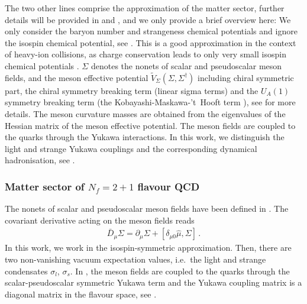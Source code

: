 \documentclass[reprint,twocolumn,superscriptaddress,preprintnumbers,amsmath,amssymb,aps,prd,floatfix]{revtex4-2}
\begin{document}
The two other lines comprise the approximation of the matter sector, further details will be provided in   and , and we only provide a brief overview here: We only consider the baryon number and strangeness chemical potentials and ignore the isospin chemical potential, see . This is a good approximation in the context of heavy-ion collisions, as charge conservation leads to only very small isospin chemical potentials \cite{Fu:2018qsk, Fu:2018swz, Wen:2019ruz}. $\Sigma$ denotes the nonets of scalar and pseudoscalar meson fields, and the meson effective potential $\tilde V_\Sigma (\Sigma,\Sigma^\dagger)$ including chiral symmetric part, the chiral symmetry breaking term (linear sigma terms) and the $U_A(1)$ symmetry breaking term (the Kobayashi-Maskawa-'t~Hooft term \cite{Kobayashi:1970ji, tHooft:1976rip, tHooft:1976snw}), see  for more details. The meson curvature masses are obtained from the eigenvalues of the Hessian matrix of the meson effective potential. The meson fields are coupled to the quarks through the Yukawa interactions. In this work, we distinguish the light and strange Yukawa couplings and the corresponding dynamical hadronisation, see . \\[-1.5ex] 


\subsubsection{Matter sector of $N_f=2+1$ flavour QCD}
\label{app:Matter_sector}

The nonets of scalar and pseudoscalar meson fields have been defined in . The covariant derivative acting on the meson fields reads 
%
\begin{align}
\bar{D}_\mu\Sigma=\partial_\mu \Sigma + [\delta_{\mu 0} \hat{\mu},\Sigma]\,.
\end{align}
%
In this work, we work in the isospin-symmetric approximation. Then, there are two non-vanishing vacuum expectation values, i.e.~the light and strange condensates $\sigma_l$, $\sigma_s$. In , the meson fields are coupled to the quarks through the scalar-pseudoscalar symmetric Yukawa term and the Yukawa coupling matrix is a diagonal matrix in the flavour space, see . 
\end{document}
